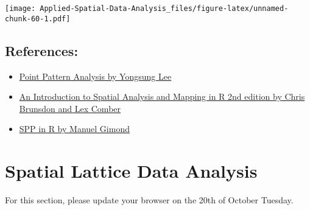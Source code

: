 \documentclass[
]{book}
\begin{document}
\texttt{[image: Applied-Spatial-Data-Analysis\_files/figure-latex/unnamed-chunk-60-1.pdf]}

\hypertarget{references}{%
\section{References:}\label{references}}

\begin{itemize}
\item
  \href{https://rpubs.com/spring19cp6521/Week11_Wednesday1}{Point Pattern Analysis by Yongsung Lee}
\item
  \href{https://bookdown.org/lexcomber/brunsdoncomber2e/Ch6.html}{An Introduction to Spatial Analysis and Mapping in R 2nd edition by Chris Brunsdon and Lex Comber}
\item
  \href{https://mgimond.github.io/Spatial/point-pattern-analysis-in-r.html}{SPP in R by Manuel Gimond}
\end{itemize}

\hypertarget{spatial-lattice-data-analysis}{%
\chapter{Spatial Lattice Data Analysis}\label{spatial-lattice-data-analysis}}

For this section, please update your browser on the 20th of October Tuesday.

  
\end{document}
